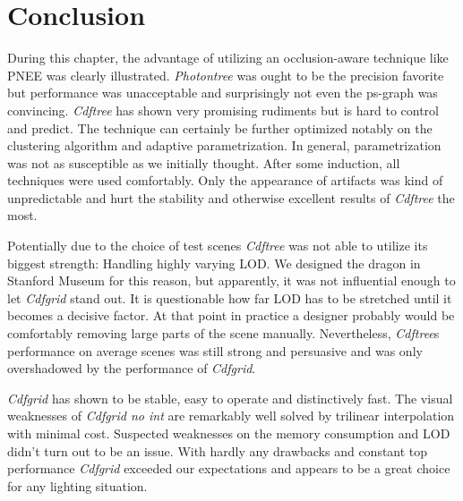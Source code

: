 \section{Conclusion}

During this chapter, the advantage of utilizing an occlusion-aware technique like PNEE was clearly illustrated. \textit{Photontree} was ought to be the precision favorite but performance was unacceptable and surprisingly not even the ps-graph was convincing. \textit{Cdftree} has shown very promising rudiments but is hard to control and predict. The technique can certainly be further optimized notably on the clustering algorithm and adaptive parametrization. In general, parametrization was not as susceptible as we initially thought. After some induction, all techniques were used comfortably. Only the appearance of artifacts was kind of unpredictable and hurt the stability and otherwise excellent results of \textit{Cdftree} the most. 

Potentially due to the choice of test scenes \textit{Cdftree} was not able to utilize its biggest strength: Handling highly varying LOD. We designed the dragon in Stanford Museum for this reason, but apparently, it was not influential enough to let \textit{Cdfgrid} stand out. It is questionable how far LOD has to be stretched until it becomes a decisive factor. At that point in practice a designer probably would be comfortably removing large parts of the scene manually. Nevertheless, \textit{Cdftree}s performance on average scenes was still strong and persuasive and was only overshadowed by the performance of \textit{Cdfgrid}.

\textit{Cdfgrid} has shown to be stable, easy to operate and distinctively fast. The visual weaknesses of \textit{Cdfgrid no int} are remarkably well solved by trilinear interpolation with minimal cost. Suspected weaknesses on the memory consumption and LOD didn't turn out to be an issue. With hardly any drawbacks and constant top performance \textit{Cdfgrid} exceeded our expectations and appears to be a great choice for any lighting situation.
